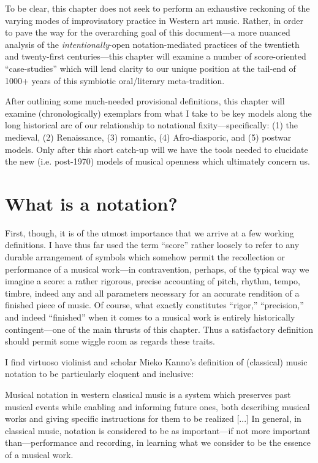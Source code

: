     To be clear, this chapter does not seek to perform an exhaustive reckoning of the varying modes of improvisatory practice in Western art music. Rather, in order to pave the way for the overarching goal of this document---a more nuanced analysis of the \textit{intentionally}-open notation-mediated practices of the twentieth and twenty-first centuries---this chapter will examine a number of score-oriented ``case-studies''  which will lend clarity to our unique position at the tail-end of 1000+ years of this symbiotic oral/literary meta-tradition.

    After outlining some much-needed provisional definitions, this chapter will examine (chronologically) exemplars from what I take to be key models along the long historical arc of our relationship to notational fixity---specifically: (1) the medieval, (2) Renaissance, (3) romantic, (4) Afro-diasporic, and (5) postwar models. Only after this short catch-up will we have the tools needed to elucidate the new (i.e. post-1970) models of musical openness which ultimately concern us.

\section{What is a notation?}

    First, though, it is of the utmost importance that we arrive at a few working definitions. I have thus far used the term ``score'' rather loosely to refer to any durable arrangement of symbols which somehow permit the recollection or performance of a musical work---in contravention, perhaps, of the typical way we imagine a score: a rather rigorous, precise accounting of pitch, rhythm, tempo, timbre, indeed any and all parameters necessary for an accurate rendition of a finished piece of music. Of course, what exactly constitutes ``rigor,'' ``precision,'' and indeed ``finished'' when it comes to a musical work is entirely historically contingent---one of the main thrusts of this chapter. Thus a satisfactory definition should permit some wiggle room as regards these traits.

    I find virtuoso violinist and scholar Mieko Kanno's definition of (classical) music notation to be particularly eloquent and inclusive:

        \begin{smallquote}
        Musical notation in western classical music is a system which preserves past musical events while enabling and informing future ones, both describing musical works and giving specific instructions for them to be realized [...] In general, in classical music, notation is considered to be as important---if not more important than---performance and recording, in learning what we consider to be the essence of a musical work.\autocite{Kanno_2007}
        \end{smallquote}
        
